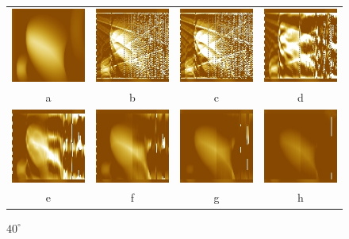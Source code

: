 \documentclass{procDDs}
\begin{document}
\begin{figure}[h!]\center%
	\begin{tabular}{cccc}
		\includegraphics[width=0.2\linewidth]{img/17/1.jpg}&
		\includegraphics[width=0.2\linewidth]{img/17/3.jpg}&
		\includegraphics[width=0.2\linewidth]{img/17/4.jpg}&
		\includegraphics[width=0.2\linewidth]{img/17/6.jpg}\\
		a & b & c & d\\
		\includegraphics[width=0.2\linewidth]{img/17/8.jpg}&
		\includegraphics[width=0.2\linewidth]{img/17/10.jpg}&
		\includegraphics[width=0.2\linewidth]{img/17/11.jpg}&
		\includegraphics[width=0.2\linewidth]{img/17/12.jpg}\\
		e & f & g & h
	\end{tabular}
	\caption{$40^\circ$}
	\label{ris:desc6}
\end{figure}
\end{document}
